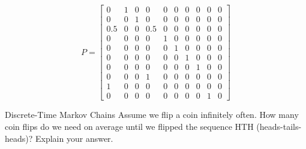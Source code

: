 \[
P =
\begin{bmatrix}
  0 & 1 & 0 & 0 & 0 & 0 & 0 & 0 & 0 & 0 \\
  0 & 0 & 1 & 0 & 0 & 0 & 0 & 0 & 0 & 0 \\
  0.5 & 0 & 0 & 0.5 & 0 & 0 & 0 & 0 & 0 & 0 \\
  0 & 0 & 0 & 0 & 1 & 0 & 0 & 0 & 0 & 0 \\
  0 & 0 & 0 & 0 & 0 & 1 & 0 & 0 & 0 & 0 \\
  0 & 0 & 0 & 0 & 0 & 0 & 1 & 0 & 0 & 0 \\
  0 & 0 & 0 & 0 & 0 & 0 & 0 & 1 & 0 & 0 \\
  0 & 0 & 0 & 1 & 0 & 0 & 0 & 0 & 0 & 0 \\
  1 & 0 & 0 & 0 & 0 & 0 & 0 & 0 & 0 & 0 \\
  0 & 0 & 0 & 0 & 0 & 0 & 0 & 0 & 1 & 0 
\end{bmatrix}
\]

\begin{problem}{Discrete-Time Markov Chains}
Assume we flip a coin infinitely often. How many coin flips do we need on average until we flipped the sequence HTH (heads-tails-heads)? Explain your answer.
\end{problem}

